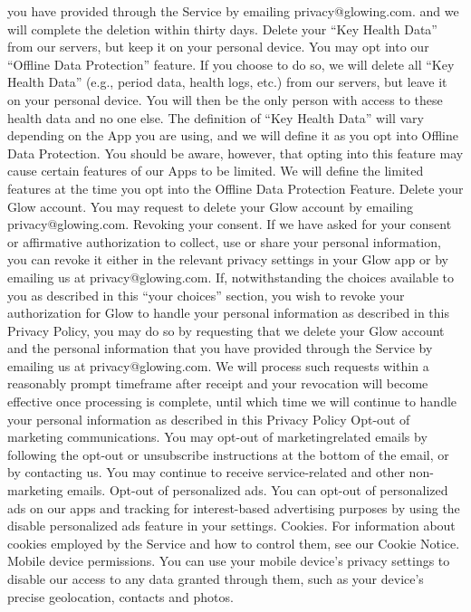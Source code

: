 you have provided through the Service by emailing privacy@glowing.com.
and we will complete the deletion within thirty days.
Delete your “Key Health Data” from our servers, but keep it on your
personal device. You may opt into our “Offline Data Protection” feature.
If you choose to do so, we will delete all “Key Health Data” (e.g., period
data, health logs, etc.) from our servers, but leave it on your personal
device. You will then be the only person with access to these health data
and no one else. The definition of “Key Health Data” will vary depending
on the App you are using, and we will define it as you opt into Offline
Data Protection. You should be aware, however, that opting into this
feature may cause certain features of our Apps to be limited. We will
define the limited features at the time you opt into the Offline Data
Protection Feature.
Delete your Glow account. You may request to delete your Glow
account by emailing privacy@glowing.com.
Revoking your consent. If we have asked for your consent or affirmative
authorization to collect, use or share your personal information, you can
revoke it either in the relevant privacy settings in your Glow app or by
emailing us at privacy@glowing.com. If, notwithstanding the choices
available to you as described in this “your choices” section, you wish to
revoke your authorization for Glow to handle your personal information
as described in this Privacy Policy, you may do so by requesting that we
delete your Glow account and the personal information that you have
provided through the Service by emailing us at privacy@glowing.com. We
will process such requests within a reasonably prompt timeframe after
receipt and your revocation will become effective once processing is
complete, until which time we will continue to handle your personal
information as described in this Privacy Policy
Opt-out of marketing communications. You may opt-out of marketingrelated emails by following the opt-out or unsubscribe instructions at the
bottom of the email, or by contacting us. You may continue to receive
service-related and other non-marketing emails.
Opt-out of personalized ads. You can opt-out of personalized ads on
our apps and tracking for interest-based advertising purposes by using
the disable personalized ads feature in your settings.
Cookies. For information about cookies employed by the Service and
how to control them, see our Cookie Notice.
Mobile device permissions. You can use your mobile device’s privacy
settings to disable our access to any data granted through them, such
as your device’s precise geolocation, contacts and photos.
